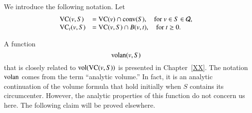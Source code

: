 %
%

\begin{definition}[$\op{VC}_t(v,S)$]  We introduce the following notation.  Let
    $$
    \begin{array}{lll}
        {\operatorname{VC}}(v,S) &= {\operatorname{VC}}(v)\cap {\operatorname{conv}}(S),\quad \text{for } v\in
        S\in{\mathcal Q},\\
        {\operatorname{VC}}_t(v,S) &= {\operatorname{VC}}(v,S)\cap B(v,t),\quad\text{for } t\ge
        0.
    \end{array}
    $$
\end{definition}




A function
    $$
    {\operatorname{volan}}(v,S)
    $$ that is closely related to ${\operatorname{vol}}({\operatorname{VC}}(v,S))$ is presented in
Chapter~\ref{XX}.  The notation ${\operatorname{volan}}$
comes from the term ``analytic volume.''  In fact, it is an
analytic continuation of the volume formula that hold initially
when $S$ contains its circumcenter.  However, the analytic
properties of this function do not concern us here.  The following
claim will be proved elsewhere.

